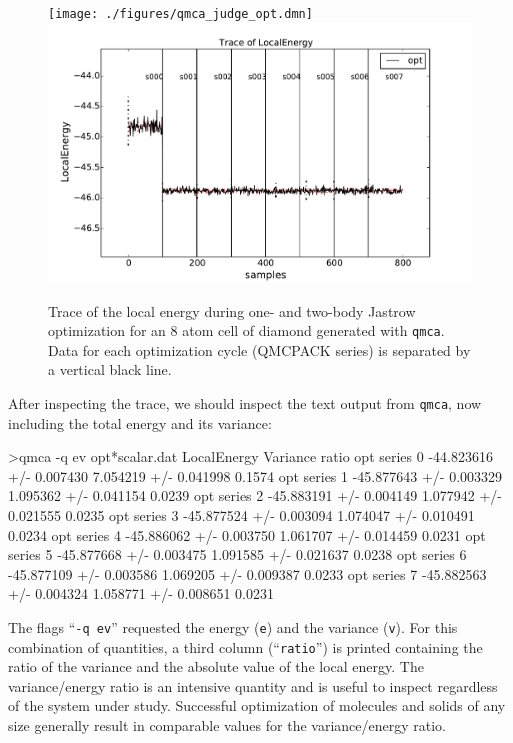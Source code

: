 \begin{figure}
\begin{center}
\ifdefined\HCode  
\texttt{[image: ./figures/qmca\_judge\_opt.dmn]}
\else
\includegraphics[trim = 0mm 0mm 0mm 0mm, clip,width=0.9\columnwidth]{./figures/qmca_judge_opt.pdf}
\fi
\end{center}
\caption{Trace of the local energy during one- and two-body Jastrow optimization for an 8 atom cell of diamond generated with \texttt{qmca}.  Data for each optimization cycle (QMCPACK series) is separated by a vertical black line.
}
\label{fig:qmca_judge_opt}
\end{figure}

After inspecting the trace, we should inspect the text output 
from \texttt{qmca}, now including the total energy and its variance:
\begin{shade}
>qmca -q ev opt*scalar.dat
                            LocalEnergy               Variance           ratio 
opt  series 0  -44.823616 +/- 0.007430   7.054219 +/- 0.041998   0.1574 
opt  series 1  -45.877643 +/- 0.003329   1.095362 +/- 0.041154   0.0239 
opt  series 2  -45.883191 +/- 0.004149   1.077942 +/- 0.021555   0.0235 
opt  series 3  -45.877524 +/- 0.003094   1.074047 +/- 0.010491   0.0234 
opt  series 4  -45.886062 +/- 0.003750   1.061707 +/- 0.014459   0.0231 
opt  series 5  -45.877668 +/- 0.003475   1.091585 +/- 0.021637   0.0238 
opt  series 6  -45.877109 +/- 0.003586   1.069205 +/- 0.009387   0.0233 
opt  series 7  -45.882563 +/- 0.004324   1.058771 +/- 0.008651   0.0231 
\end{shade}
\noindent
The flags ``\texttt{-q ev}'' requested the energy (\texttt{e}) and 
the variance (\texttt{v}).  For this combination of quantities, a 
third column (``\texttt{ratio}'') is printed containing the ratio 
of the variance and the absolute value of the local energy.
The variance/energy ratio is an intensive quantity and is useful  
to inspect regardless of the system under study.  Successful 
optimization of molecules and solids of any size generally result 
in comparable values for the variance/energy ratio. 

